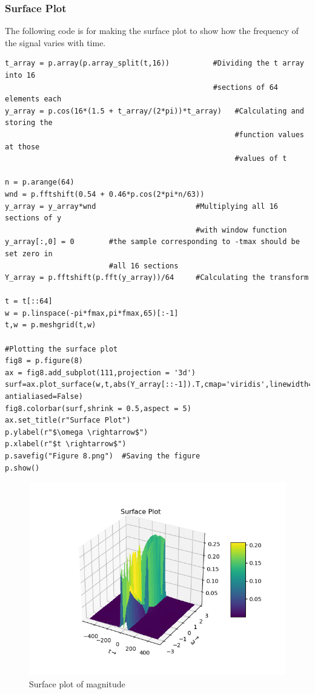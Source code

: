 \documentclass[11pt, a4paper]{article}
\begin{document}
        \subsubsection*{Surface Plot}
        The following code is for making the surface plot to show how the frequency of the signal varies with time.
            \begin{verbatim}
t_array = p.array(p.array_split(t,16))          #Dividing the t array into 16
                                                #sections of 64 elements each
y_array = p.cos(16*(1.5 + t_array/(2*pi))*t_array)   #Calculating and storing the
                                                     #function values at those
                                                     #values of t

n = p.arange(64)
wnd = p.fftshift(0.54 + 0.46*p.cos(2*pi*n/63))
y_array = y_array*wnd                       #Multiplying all 16 sections of y
                                            #with window function
y_array[:,0] = 0        #the sample corresponding to -tmax should be set zero in
                        #all 16 sections
Y_array = p.fftshift(p.fft(y_array))/64     #Calculating the transform

t = t[::64]
w = p.linspace(-pi*fmax,pi*fmax,65)[:-1]
t,w = p.meshgrid(t,w)

#Plotting the surface plot
fig8 = p.figure(8)
ax = fig8.add_subplot(111,projection = '3d')
surf=ax.plot_surface(w,t,abs(Y_array[::-1]).T,cmap='viridis',linewidth=0, antialiased=False)
fig8.colorbar(surf,shrink = 0.5,aspect = 5)
ax.set_title(r"Surface Plot")
p.ylabel(r"$\omega \rightarrow$")
p.xlabel(r"$t \rightarrow$")
p.savefig("Figure 8.png")  #Saving the figure
p.show()
            \end{verbatim}
            \begin{figure}[!h]
                \centering
                \includegraphics[scale = 1]{Figure 8.png}
                \caption{Surface plot of magnitude}
                \label{fig:Figure 8}
            \end{figure}
\end{document}

